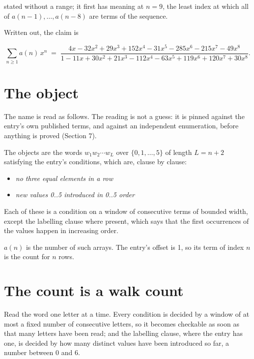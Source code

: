 \documentclass[11pt]{article}
\theoremstyle{definition}
\begin{document}
stated without a range; it first has meaning at $n = 9$, the least index at which all of $a(n-1),\dots,a(n-8)$ are terms of the sequence.

Written out, the claim is

\[\sum_{n \ge 1} a(n)\,x^n \;=\; \frac{4x - 32x^{2} + 29x^{3} + 152x^{4} - 31x^{5} - 285x^{6} - 215x^{7} - 49x^{8}}{1 - 11x + 30x^{2} + 21x^{3} - 112x^{4} - 63x^{5} + 119x^{6} + 120x^{7} + 30x^{8}}.\]

\section{The object}

The name is read as follows. The reading is not a guess: it is pinned against the entry's own published terms, and against an independent enumeration, before anything is proved (Section 7).

The objects are the words $w_1 w_2 \cdots w_L$ over $\{0,1,\dots,5\}$ of length $L = n + 2$ satisfying the entry's conditions, which are, clause by clause:

\begin{itemize}

\item {\itshape no three equal elements in a row}

\item {\itshape new values 0..5 introduced in 0..5 order}

\end{itemize}

Each of these is a condition on a window of consecutive terms of bounded width, except the labelling clause where present, which says that the first occurrences of the values happen in increasing order.

$a(n)$ is the number of such arrays. The entry's offset is 1, so its term of index $n$ is the count for $n$ rows.

\section{The count is a walk count}

Read the word one letter at a time. Every condition is decided by a window of at most a fixed number of consecutive letters, so it becomes checkable as soon as that many letters have been read; and the labelling clause, where the entry has one, is decided by how many distinct values have been introduced so far, a number between $0$ and 6.
\end{document}
